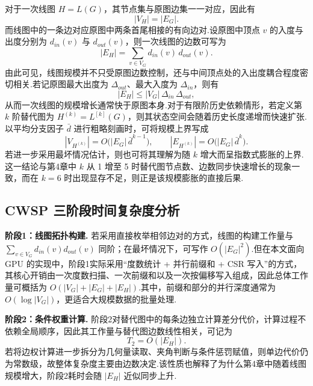 对于一次线图 $H=L(G)$，其节点集与原图边集一一对应，因此有
\begin{equation}
    |V_H| = |E_G|.
\end{equation}
而线图中的一条边对应原图中两条首尾相接的有向边对.设原图中顶点 $v$ 的入度与出度分别为 $d_{in}(v)$ 与 $d_{out}(v)$，则一次线图的边数可写为
\begin{equation}
    |E_H| = \sum_{v \in V_G} d_{in}(v)\, d_{out}(v).
\end{equation}
由此可见，线图规模并不只受原图边数控制，还与中间顶点处的入出度耦合程度密切相关.若记原图最大出度为 $\Delta_{out}$、最大入度为 $\Delta_{in}$，则有
\begin{equation}
    |E_H| \le |V_G|\,\Delta_{in}\,\Delta_{out},
\end{equation}
从而一次线图的规模增长通常快于原图本身.对于有限阶历史依赖情形，若定义第 $k$ 阶替代图为 $H^{(k)}=L^{[k]}(G)$，则其状态空间会随着历史长度递增而快速扩张.以平均分支因子 $\bar d$ 进行粗略刻画时，可将规模上界写成
\begin{equation}
    |V_{H^{(k)}}| = O\bigl(|E_G|\,\bar d^{k-1}\bigr), \qquad |E_{H^{(k)}}| = O\bigl(|E_G|\,\bar d^{k}\bigr).
\end{equation}
若进一步采用最坏情况估计，则也可将其理解为随 $k$ 增大而呈指数式膨胀的上界.这一结论与第4章中 $k$ 从 1 增至 5 时替代图节点数、边数同步快速增长的现象一致，而在 $k=6$ 时出现显存不足，则正是该规模膨胀的直接后果.

\subsection{CWSP 三阶段时间复杂度分析}

\textbf{阶段1：线图拓扑构建.} 若采用直接枚举相邻边对的方式，线图的构建工作量与 $\sum_{v\in V_G} d_{in}(v)d_{out}(v)$ 同阶；在最坏情况下，可写作 $O(|E_G|^2)$.但在本文面向 GPU 的实现中，阶段1实际采用“度数统计 + 并行前缀和 + CSR 写入”的方式，其核心开销由一次度数扫描、一次前缀和以及一次按偏移写入组成，因此总体工作量可概括为 $O(|V_G|+|E_G|+|E_H|)$.其中，前缀和部分的并行深度通常为 $O(\log |V_G|)$，更适合大规模数据的批量处理.

\textbf{阶段2：条件权重计算.} 阶段2对替代图中的每条边独立计算差分代价，计算过程不依赖全局顺序，因此其工作量与替代图边数线性相关，可记为
\begin{equation}
    T_2 = O(|E_H|).
\end{equation}
若将边权计算进一步拆分为几何量读取、夹角判断与条件惩罚赋值，则单边代价仍为常数级，故整体复杂度主要由边数决定.该性质也解释了为什么第4章中随着线图规模增大，阶段2耗时会随 $|E_H|$ 近似同步上升.

